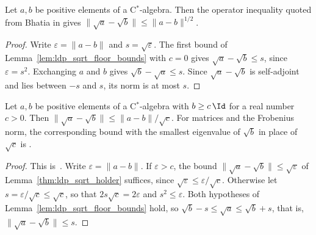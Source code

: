 \begin{lemma}
    \label{thm:ldp_sqrt_holder}
    \leanok
    Let $a,b$ be positive elements of a C$^*$-algebra. Then the operator
    inequality quoted from Bhatia in
    \cite[Supplemental Material, eq.~(26)]{Piroli2021LOCC} gives
    $\lVert\sqrt a-\sqrt b\rVert\le\lVert a-b\rVert^{1/2}$.
\end{lemma}
\begin{proof}
    \leanok
    Write $\varepsilon=\lVert a-b\rVert$ and $s=\sqrt\varepsilon$. The first
    bound of Lemma~\ref{lem:ldp_sqrt_floor_bounds} with $c=0$ gives
    $\sqrt a-\sqrt b\le s$, since $\varepsilon=s^2$. Exchanging $a$ and $b$
    gives $\sqrt b-\sqrt a\le s$. Since $\sqrt a-\sqrt b$ is self-adjoint and
    lies between $-s$ and $s$, its norm is at most $s$.
\end{proof}

\begin{lemma}
    \label{thm:ldp_sqrt_lipschitz}
    \leanok
    Let $a,b$ be positive elements of a C$^*$-algebra with $b\ge c\,\Id$ for
    a real number $c>0$. Then
    $\lVert\sqrt a-\sqrt b\rVert\le\lVert a-b\rVert/\sqrt c$.
    For matrices and the Frobenius norm, the corresponding bound with the
    smallest eigenvalue of $\sqrt b$ in place of $\sqrt c$ is
    \cite[App.~B3, eqs.~(S27)--(S31)]{Murota2026ExactLogDepth}.
\end{lemma}
\begin{proof}
    \leanok
    This is~\cite[``Square root near a positive definite
        element'']{QICLean2026Blueprint}.
    Write $\varepsilon=\lVert a-b\rVert$. If $\varepsilon>c$, the bound
    $\lVert\sqrt a-\sqrt b\rVert\le\sqrt\varepsilon$ of
    Lemma~\ref{thm:ldp_sqrt_holder} suffices, since
    $\sqrt\varepsilon\le\varepsilon/\sqrt c$. Otherwise let
    $s=\varepsilon/\sqrt c\le\sqrt c$, so that $2s\sqrt c=2\varepsilon$ and
    $s^2\le\varepsilon$. Both hypotheses of
    Lemma~\ref{lem:ldp_sqrt_floor_bounds} hold, so
    $\sqrt b-s\le\sqrt a\le\sqrt b+s$, that is,
    $\lVert\sqrt a-\sqrt b\rVert\le s$.
\end{proof}

